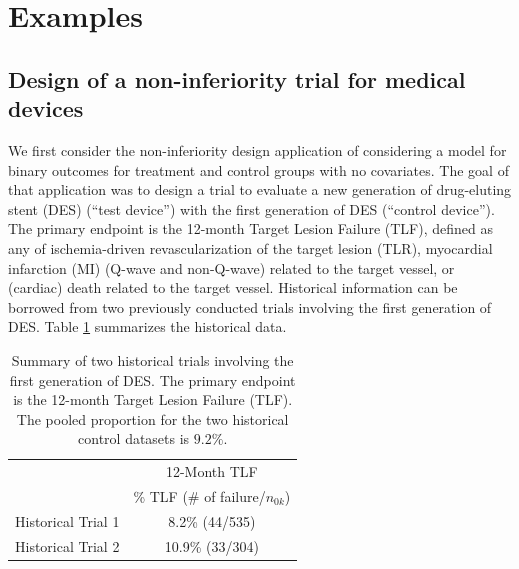 \section*{Examples} \label{sec:ex}
\subsection*{Design of a non-inferiority trial for medical devices}
\label{sec:ex1}
We first consider the non-inferiority design application of \cite{Chen_2011} considering a model for binary outcomes for treatment and control groups with no covariates. The goal of that application was to design a trial to evaluate a new generation of drug-eluting stent (DES) (“test device”) with the first generation of DES (“control device”). The primary endpoint is the 12-month Target Lesion Failure (TLF), defined as any of ischemia-driven revascularization of the target lesion (TLR), myocardial infarction (MI) (Q-wave and non-Q-wave) related to the target vessel, or (cardiac) death related to the target vessel. Historical information can be borrowed from two previously conducted trials involving the first generation of DES. Table \ref{summary} summarizes the historical data. 

\begin{table}[t!]
\centering
\setlength{\extrarowheight}{5pt}
\begin{tabular}{cc}
\toprule
& 12-Month TLF   \\
& \% TLF (\# of failure/$n_{0k}$)\\
\midrule
Historical Trial 1 & 8.2\% (44/535)  \\
Historical Trial 2 & 10.9\% (33/304)    \\
\bottomrule
\end{tabular}
\caption{Summary of two historical trials involving the first generation of DES. The primary endpoint is the 12-month Target Lesion Failure (TLF). The pooled proportion for the two historical control datasets is $9.2\%$.}
\label{summary}
\end{table}

